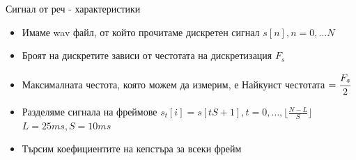 \documentclass[9pt]{beamer}
\begin{document}
    \begin{frame}[t]{Сигнал от реч - характеристики}
        \begin{itemize}
            \setlength\itemsep{\fill}
            \pause
            \item Имаме wav файл, от който прочитаме дискретен сигнал $s[n], n = 0,\ldots N$
            \pause
            \item Броят на дискретите зависи от честотата на дискретизация $F_s$
            \pause
            \item Максималната честота, която можем да измерим, е Найкуист честотата $= \cfrac{F_s}{2}$ 
            \pause
            \item Разделяме сигнала на фреймове $s_t[i] = s[tS + 1], t = 0,\ldots, \lfloor \frac{N-L}{S} \rfloor$ 
            \pause $L = 25 ms, S = 10 ms$ 
            \pause
            \item Търсим коефициентите на кепстъра за всеки фрейм
        \end{itemize}
    \end{frame}
\end{document}
